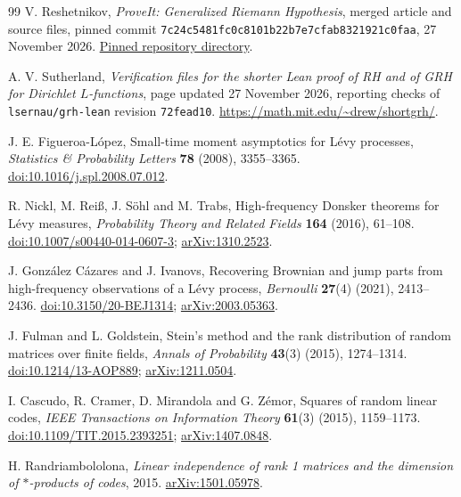 \begin{thebibliography}{99}
V. Reshetnikov, \emph{ProveIt: Generalized Riemann Hypothesis}, merged article and source files, pinned commit \texttt{7c24c5481fc0c8101b22b7e7cfab8321921c0faa}, 27 November 2026.
\href{https://github.com/VladimirReshetnikov/ProveIt/tree/7c24c5481fc0c8101b22b7e7cfab8321921c0faa/Analysis/GeneralizedRiemannHypothesis}{Pinned repository directory}.

A. V. Sutherland, \emph{Verification files for the shorter Lean proof of RH and of GRH for Dirichlet $L$-functions}, page updated 27 November 2026, reporting checks of \texttt{lsernau/grh-lean} revision \texttt{72fead10}.
\url{https://math.mit.edu/~drew/shortgrh/}.

J. E. Figueroa-L\'opez, Small-time moment asymptotics for L\'evy processes,
\emph{Statistics \& Probability Letters} \textbf{78} (2008), 3355--3365.
\href{https://doi.org/10.1016/j.spl.2008.07.012}{doi:10.1016/j.spl.2008.07.012}.

R. Nickl, M. Rei\ss, J. S\"ohl and M. Trabs, High-frequency Donsker theorems for L\'evy measures,
\emph{Probability Theory and Related Fields} \textbf{164} (2016), 61--108.
\href{https://doi.org/10.1007/s00440-014-0607-3}{doi:10.1007/s00440-014-0607-3};
\href{https://arxiv.org/abs/1310.2523}{arXiv:1310.2523}.

J. Gonz\'alez C\'azares and J. Ivanovs, Recovering Brownian and jump parts from high-frequency observations of a L\'evy process,
\emph{Bernoulli} \textbf{27}(4) (2021), 2413--2436.
\href{https://doi.org/10.3150/20-BEJ1314}{doi:10.3150/20-BEJ1314};
\href{https://arxiv.org/abs/2003.05363}{arXiv:2003.05363}.

J. Fulman and L. Goldstein, Stein's method and the rank distribution of random matrices over finite fields,
\emph{Annals of Probability} \textbf{43}(3) (2015), 1274--1314.
\href{https://doi.org/10.1214/13-AOP889}{doi:10.1214/13-AOP889};
\href{https://arxiv.org/abs/1211.0504}{arXiv:1211.0504}.

I. Cascudo, R. Cramer, D. Mirandola and G. Z\'emor, Squares of random linear codes,
\emph{IEEE Transactions on Information Theory} \textbf{61}(3) (2015), 1159--1173.
\href{https://doi.org/10.1109/TIT.2015.2393251}{doi:10.1109/TIT.2015.2393251};
\href{https://arxiv.org/abs/1407.0848}{arXiv:1407.0848}.

H. Randriambololona, \emph{Linear independence of rank 1 matrices and the dimension of $*$-products of codes}, 2015.
\href{https://arxiv.org/abs/1501.05978}{arXiv:1501.05978}.
\end{thebibliography}
